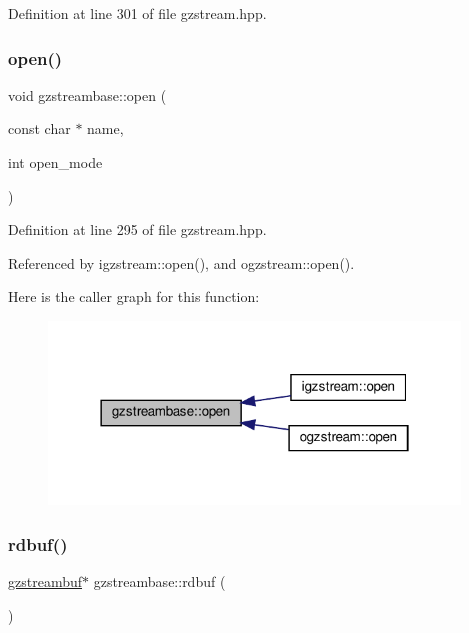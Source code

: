 Definition at line 301 of file gzstream.\+hpp.

\mbox{\label{classgzstreambase_a88288f683ba4b4978aef1c460ff669c4}} 
\subsubsection{\texorpdfstring{open()}{open()}}
{\footnotesize\ttfamily void gzstreambase\+::open (\begin{DoxyParamCaption}\item[{const char $\ast$}]{name,  }\item[{int}]{open\+\_\+mode }\end{DoxyParamCaption})\hspace{0.3cm}{\ttfamily [inline]}}



Definition at line 295 of file gzstream.\+hpp.



Referenced by igzstream\+::open(), and ogzstream\+::open().

Here is the caller graph for this function\+:
\nopagebreak
\begin{figure}[H]
\begin{center}
\leavevmode
\includegraphics[width=310pt]{dc/d09/classgzstreambase_a88288f683ba4b4978aef1c460ff669c4_icgraph}
\end{center}
\end{figure}
\mbox{\label{classgzstreambase_a85a5899a56d1ee9259d02083195471ba}} 
\subsubsection{\texorpdfstring{rdbuf()}{rdbuf()}}
{\footnotesize\ttfamily \hyperlink{classgzstreambuf}{gzstreambuf}$\ast$ gzstreambase\+::rdbuf (\begin{DoxyParamCaption}{ }\end{DoxyParamCaption})\hspace{0.3cm}{\ttfamily [inline]}}



